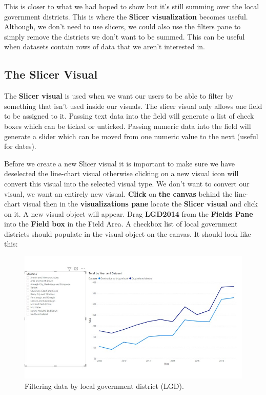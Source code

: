 \documentclass[
]{book}
\begin{document}
This is closer to what we had hoped to show but it's still summing over the local government districts. This is where the \textbf{Slicer visualization} becomes useful. Although, we don't need to use slicers, we could also use the filters pane to simply remove the districts we don't want to be summed. This can be useful when datasets contain rows of data that we aren't interested in.

\hypertarget{the-slicer-visual}{%
\subsection{The Slicer Visual}\label{the-slicer-visual}}

The \textbf{Slicer visual} is used when we want our users to be able to filter by something that isn't used inside our visuals. The slicer visual only allows one field to be assigned to it. Passing text data into the field will generate a list of check boxes which can be ticked or unticked. Passing numeric data into the field will generate a slider which can be moved from one numeric value to the next (useful for dates).

Before we create a new Slicer visual it is important to make sure we have deselected the line-chart visual otherwise clicking on a new visual icon will convert this visual into the selected visual type. We don't want to convert our visual, we want an entirely new visual. \textbf{Click} on \textbf{the canvas} behind the line-chart visual then in the \textbf{visualizations pane} locate the \textbf{Slicer visual} and click on it. A new visual object will appear. Drag \textbf{LGD2014} from the \textbf{Fields Pane} into the \textbf{Field box} in the Field Area. A checkbox list of local government districts should populate in the visual object on the canvas. It should look like this:

\begin{figure}
\centering
\includegraphics{bi8.jpg}
\caption{Filtering data by local government district (LGD).}
\end{figure}
\end{document}
